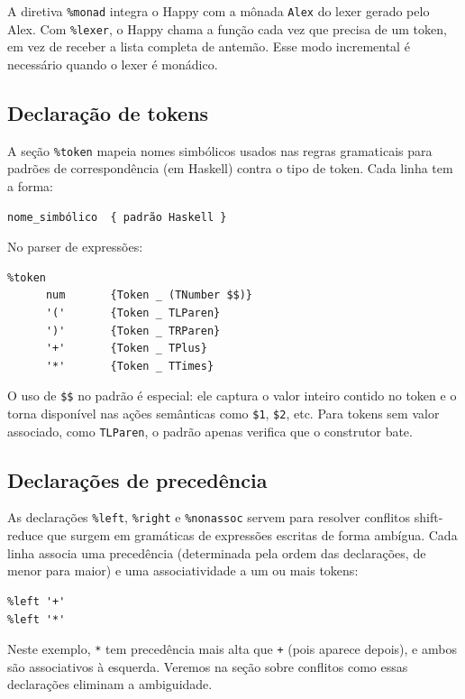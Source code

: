 A diretiva \verb|%monad| integra o Happy com a
mônada \verb|Alex| do lexer gerado pelo Alex. Com
\verb|%lexer|, o Happy chama a função
 cada vez que precisa de um token, em
vez de receber a lista completa de antemão. Esse modo incremental é
necessário quando o lexer é monádico.

\subsection{Declaração de tokens}

A seção \verb|%token| mapeia nomes simbólicos
usados nas regras gramaticais para padrões de correspondência (em
Haskell) contra o tipo de token. Cada linha tem a forma:

\begin{verbatim}
nome_simbólico  { padrão Haskell }
\end{verbatim}

No parser de expressões:

\begin{verbatim}
%token
      num       {Token _ (TNumber $$)}
      '('       {Token _ TLParen}
      ')'       {Token _ TRParen}
      '+'       {Token _ TPlus}
      '*'       {Token _ TTimes}
\end{verbatim}

O uso de \verb|$$| no padrão
 é especial: ele
captura o valor inteiro contido no token e o torna disponível nas
ações semânticas como \verb|$1|,
\verb|$2|, etc. Para tokens sem valor associado,
como \verb|TLParen|, o padrão apenas verifica que
o construtor bate.

\subsection{Declarações de precedência}

As declarações \verb|%left|,
\verb|%right| e
\verb|%nonassoc| servem para resolver conflitos
shift-reduce que surgem em gramáticas de expressões escritas de forma
ambígua. Cada linha associa uma precedência (determinada pela ordem
das declarações, de menor para maior) e uma associatividade a um ou mais tokens:

\begin{verbatim}
%left '+'
%left '*'
\end{verbatim}

Neste exemplo, \verb|*| tem precedência mais alta
que \verb|+| (pois aparece depois), e ambos são
associativos à esquerda. Veremos na seção sobre conflitos como essas
declarações eliminam a ambiguidade.

